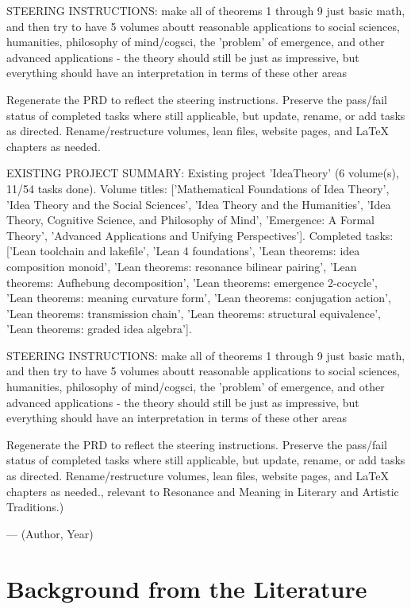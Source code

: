 {STEERING INSTRUCTIONS: make all of theorems 1 through 9 just basic math, and then try to have 5 volumes aboutt reasonable applications to social sciences, humanities, philosophy of mind/cogsci, the 'problem' of emergence, and other advanced applications - the theory should still be just as impressive, but everything should have an interpretation in terms of these other areas

Regenerate the PRD to reflect the steering instructions. Preserve the pass/fail status of completed tasks where still applicable, but update, rename, or add tasks as directed. Rename/restructure volumes, lean files, website pages, and LaTeX chapters as needed.

EXISTING PROJECT SUMMARY: Existing project 'IdeaTheory' (6 volume(s), 11/54 tasks done). Volume titles: ['Mathematical Foundations of Idea Theory', 'Idea Theory and the Social Sciences', 'Idea Theory and the Humanities', 'Idea Theory, Cognitive Science, and Philosophy of Mind', 'Emergence: A Formal Theory', 'Advanced Applications and Unifying Perspectives']. Completed tasks: ['Lean toolchain and lakefile', 'Lean 4 foundations', 'Lean theorems: idea composition monoid', 'Lean theorems: resonance bilinear pairing', 'Lean theorems: Aufhebung decomposition', 'Lean theorems: emergence 2-cocycle', 'Lean theorems: meaning curvature form', 'Lean theorems: conjugation action', 'Lean theorems: transmission chain', 'Lean theorems: structural equivalence', 'Lean theorems: graded idea algebra'].

STEERING INSTRUCTIONS: make all of theorems 1 through 9 just basic math, and then try to have 5 volumes aboutt reasonable applications to social sciences, humanities, philosophy of mind/cogsci, the 'problem' of emergence, and other advanced applications - the theory should still be just as impressive, but everything should have an interpretation in terms of these other areas

Regenerate the PRD to reflect the steering instructions. Preserve the pass/fail status of completed tasks where still applicable, but update, rename, or add tasks as directed. Rename/restructure volumes, lean files, website pages, and LaTeX chapters as needed., relevant to Resonance and Meaning in Literary and Artistic Traditions.)}{--- (Author, Year)}

        \section{Background from the Literature}
        \label{sec:v3c5.lit}

